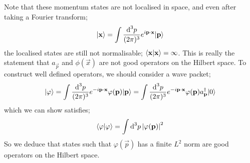 \paraskip
Note that these momentum states are not localised in space, and even after taking a Fourier transform;
\begin{equation*}
\ket{\vec{x}} = \int{\frac{\ud^3 p}{(2\pi)^3}e^{i\vec{p}\cdot\vec{x}}\ket{\vec{p}}}
\end{equation*}
the localised states are still not normalisable; $\braket{\mathbf{x}}{\mathbf{x}} = \infty$. This is really the statement that $a_{\vec{p}}$ and $\phi(\vec{x})$ are not good operators on the Hilbert space. To construct well defined operators, we should consider a wave packet;
\begin{equation}
\ket{\varphi} = \int{\frac{\ud^3 p}{(2\pi)^3}e^{-i\vec{p}\cdot\vec{x}}\varphi(\vec{p})\ket{\vec{p}}} = \int{\frac{\ud^3 p}{(2\pi)^3}e^{-i\vec{p}\cdot\vec{x}}\varphi(\vec{p})a_{\vec{p}}\dagg \ket{0}}
\end{equation}
which we can show satisfies;
\begin{equation*}
\braket{\varphi}{\varphi} = \int{\upd{^3 p}\abs{\varphi(\vec{p})}^2}
\end{equation*}
So we deduce that states such that $\varphi(\vec{p})$ has a finite $L^2$ norm are good operators on the Hilbert space.
